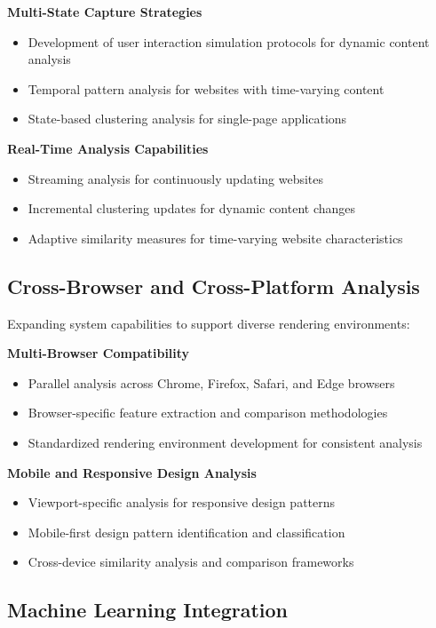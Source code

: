 \textbf{Multi-State Capture Strategies}
\begin{itemize}
    \item Development of user interaction simulation protocols for dynamic content analysis
    \item Temporal pattern analysis for websites with time-varying content
    \item State-based clustering analysis for single-page applications
\end{itemize}

\textbf{Real-Time Analysis Capabilities}
\begin{itemize}
    \item Streaming analysis for continuously updating websites
    \item Incremental clustering updates for dynamic content changes
    \item Adaptive similarity measures for time-varying website characteristics
\end{itemize}

\subsection{Cross-Browser and Cross-Platform Analysis}
\label{subsec:cross-platform}

Expanding system capabilities to support diverse rendering environments:

\textbf{Multi-Browser Compatibility}
\begin{itemize}
    \item Parallel analysis across Chrome, Firefox, Safari, and Edge browsers
    \item Browser-specific feature extraction and comparison methodologies
    \item Standardized rendering environment development for consistent analysis
\end{itemize}

\textbf{Mobile and Responsive Design Analysis}
\begin{itemize}
    \item Viewport-specific analysis for responsive design patterns
    \item Mobile-first design pattern identification and classification
    \item Cross-device similarity analysis and comparison frameworks
\end{itemize}

\subsection{Machine Learning Integration}
\label{subsec:ml-integration}

